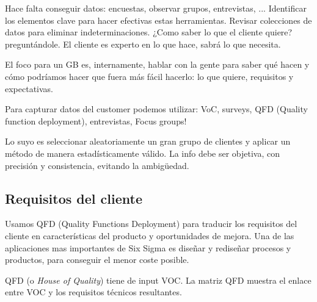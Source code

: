 \documentclass[]{article}
\begin{document}
Hace falta conseguir datos: encuestas, observar grupos, entrevistas, ... Identificar los elementos clave para hacer efectivas estas herramientas. Revisar colecciones de datos para eliminar indeterminaciones.
¿Como saber lo que el cliente quiere? preguntándole. El cliente es experto en lo que hace, sabrá lo que necesita. 

El foco para un GB es, internamente, hablar con la gente para saber qué hacen y cómo podríamos hacer que fuera más fácil hacerlo: lo que quiere, requisitos y expectativas. 

Para capturar datos del customer podemos utilizar: VoC, surveys, QFD (Quality function deployment), entrevistas, Focus groups!

Lo suyo es seleccionar aleatoriamente un gran grupo de clientes y aplicar un método de manera estadísticamente válido. La info debe ser objetiva, con precisión y consistencia, evitando la ambigüedad. 

\subsection{Requisitos del cliente}

Usamos QFD (Quality Functions Deployment) para traducir los requisitos del cliente en características del producto y oportunidades de mejora. Una de las aplicaciones mas importantes de Six Sigma es diseñar y rediseñar procesos y productos, para conseguir el menor coste posible.

QFD (o \textit{House of Quality}) tiene de input VOC. La matriz QFD muestra el enlace entre VOC y los requisitos técnicos resultantes.
\end{document}

